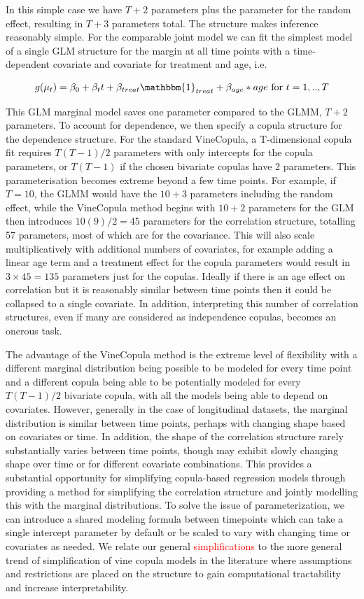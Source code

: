 \documentclass{article}
\newcommand{\jsschange}[1]{\textcolor{red}{#1}}
\begin{document}
In this simple case we have $T+2$ parameters plus the parameter for the random effect, resulting in $T+3$ parameters total. The structure makes inference reasonably simple. For the comparable joint model we can fit the simplest model of a single GLM structure for the margin at all time points with a time-dependent covariate and covariate for treatment and age, i.e.

$$g(\mu_{t})=\beta_0 + \beta_t t+\beta_{treat}\mathbbm{1}_{treat}+\beta_{age}*age \text{ for } t=1,..,T$$

This GLM marginal model saves one parameter compared to the GLMM, $T+2$ parameters. To account for dependence, we then specify a copula structure for the dependence structure. For the standard VineCopula, a T-dimensional copula fit requires $T(T-1)/2$ parameters with only intercepts for the copula parameters, or $T(T-1)$ if the chosen bivariate copulas have 2 parameters. This parameterisation becomes extreme beyond a few time points. For example, if $T=10$, the GLMM would have the $10+3$ parameters including the random effect, while the VineCopula method begins with $10+2$ parameters for the GLM then introduces $10(9)/2=45$ parameters for the correlation structure, totalling 57 parameters, most of which are for the covariance. This will also scale multiplicatively with additional numbers of covariates, for example adding a linear age term and a treatment effect for the copula parameters would result in $3\times 45=135$ parameters just for the copulas. Ideally if there is an age effect on correlation but it is reasonably similar between time points then it could be collapsed to a single covariate. In addition, interpreting this number of correlation structures, even if many are considered as independence copulas, becomes an onerous task. 

The advantage of the VineCopula method is the extreme level of flexibility with a different marginal distribution being possible to be modeled for every time point and a different copula being able to be potentially modeled for every $T(T-1)/2$ bivariate copula, with all the models being able to depend on covariates. However, generally in the case of longitudinal datasets, the marginal distribution is similar between time points, perhaps with changing shape based on covariates or time. In addition, the shape of the correlation structure rarely substantially varies between time points, though may exhibit slowly changing shape over time or for different covariate combinations. This provides a substantial opportunity for simplifying copula-based regression models through providing a method for simplifying the correlation structure and jointly modelling this with the marginal distributions. To solve the issue of parameterization, we can introduce a shared modeling formula between timepoints which can take a single intercept parameter by default or be scaled to vary with changing time or covariates as needed. We relate our general \jsschange{simplifications} to the more general trend of simplification of vine copula models in the literature where assumptions and restrictions are placed on the structure to gain computational tractability and increase interpretability\cite{nagler_simplified_2025}.
\end{document}
